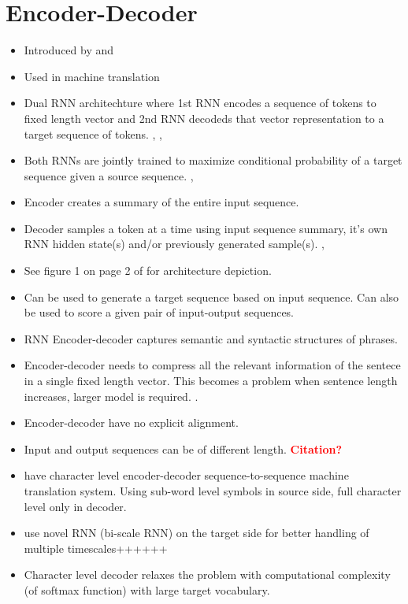 \documentclass[12pt,a4paper,english
]{tutthesis}
\begin{document}
\section{Encoder-Decoder}
\begin{itemize}
\item Introduced by \cite{Sutskever2014} and \cite{Cho2014}
\item Used in machine translation \cite{Chung2016}
\item Dual RNN architechture where 1st RNN encodes a sequence of tokens to fixed length vector and 2nd RNN decodeds that vector representation to a target sequence of tokens. \cite{Cho2014}, \cite{Bahdanau2014}, \cite{Sutskever2014}
\item Both RNNs are jointly trained to maximize conditional probability of a target sequence given a source sequence. \cite{Cho2014}, \cite{Bahdanau2014}
\item Encoder creates a summary of the entire input sequence. \cite{Cho2014}
\item Decoder samples a token at a time using input sequence summary, it's own RNN hidden state(s) and/or previously generated sample(s). \cite{Cho2014}, \cite{Bahdanau2014}
\item See figure 1 on page 2 of \cite{Cho2014} for architecture depiction.
\item Can be used to generate a target sequence based on input sequence. Can also be used to score a given pair of input-output sequences. \cite{Cho2014}
\item RNN Encoder-decoder captures semantic and syntactic structures of phrases. \cite{Cho2014}
\item Encoder-decoder needs to compress all the relevant information of the sentece in a single fixed length vector. This becomes a problem when sentence length increases, larger model is required. \cite{Bahdanau2014}.
\item Encoder-decoder have no explicit alignment. \cite{Liu2016a}
\item Input and output sequences can be of different length. \textbf{\textcolor{red}{Citation?}}
\item \cite{Chung2016} have character level encoder-decoder sequence-to-sequence machine translation system. Using sub-word level symbols in source side, full character level only in decoder.
\item \cite{Chung2016} use novel RNN (bi-scale RNN) on the target side for better handling of multiple timescales++++++
\item Character level decoder relaxes the problem with computational complexity (of softmax function) with large target vocabulary. \cite{Chung2016}

\end{itemize}
\end{document}
